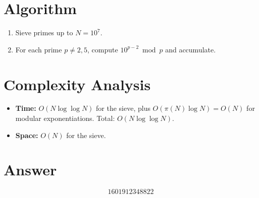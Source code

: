 \documentclass[12pt]{article}
\begin{document}
\section{Algorithm}
\begin{enumerate}
    \item Sieve primes up to $N = 10^7$.
    \item For each prime $p \neq 2, 5$, compute $10^{p-2} \bmod p$ and accumulate.
\end{enumerate}

\section{Complexity Analysis}
\begin{itemize}
    \item \textbf{Time:} $O(N\log\log N)$ for the sieve, plus $O(\pi(N)\log N) = O(N)$ for modular exponentiations. Total: $O(N\log\log N)$.
    \item \textbf{Space:} $O(N)$ for the sieve.
\end{itemize}

\section{Answer}

\[
\boxed{1601912348822}
\]
\end{document}
